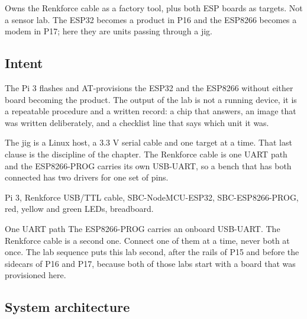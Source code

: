 
\begin{unique}
Owns the Renkforce cable as a factory tool, plus both ESP boards as targets. Not a sensor lab. The ESP32 becomes a product in P16 and the ESP8266 becomes a modem in P17; here they are units passing through a jig.
\end{unique}

\subsection*{Intent}

The Pi 3 flashes and AT-provisions the ESP32 and the ESP8266 without either board becoming the product. The output of the lab is not a running device, it is a repeatable procedure and a written record: a chip that answers, an image that was written deliberately, and a checklist line that says which unit it was.

The jig is a Linux host, a 3.3 V serial cable and one target at a time. That last clause is the discipline of the chapter. The Renkforce cable is one UART path and the ESP8266-PROG carries its own USB-UART, so a bench that has both connected has two drivers for one set of pins.

\begin{kit}
Pi 3, Renkforce USB/TTL cable, SBC-NodeMCU-ESP32, SBC-ESP8266-PROG, red, yellow and green LEDs, breadboard.
\end{kit}

\begin{note}{One UART path}
The ESP8266-PROG carries an onboard USB-UART. The Renkforce cable is a second one. Connect one of them at a time, never both at once. The lab sequence puts this lab second, after the rails of P15 and before the sidecars of P16 and P17, because both of those labs start with a board that was provisioned here.
\end{note}

\subsection*{System architecture}


